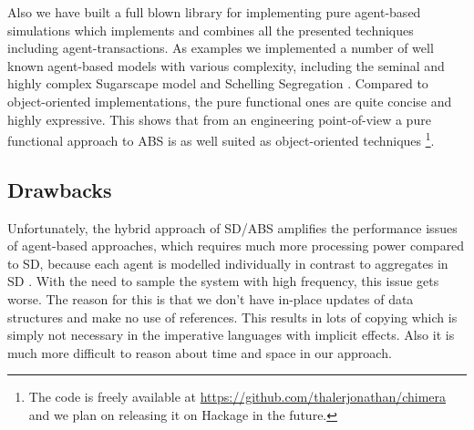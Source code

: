 Also we have built a full blown library for implementing pure agent-based simulations which implements and combines all the presented techniques including agent-transactions. As examples we implemented a number of well known agent-based models with various complexity, including the seminal and highly complex Sugarscape model \cite{epstein_growing_1996} and Schelling Segregation \cite{schelling_dynamic_1971}. Compared to object-oriented implementations, the pure functional ones are quite concise and highly expressive. This shows that from an engineering point-of-view a pure functional approach to ABS is as well suited as object-oriented techniques \footnote{The code is freely available at \url{https://github.com/thalerjonathan/chimera} and we plan on releasing it on Hackage in the future.}.

\subsection*{Drawbacks}
Unfortunately, the hybrid approach of SD/ABS amplifies the performance issues of agent-based approaches, which requires much more processing power compared to SD, because each agent is modelled individually in contrast to aggregates in SD \cite{macal_agent-based_2010}. With the need to sample the system with high frequency, this issue gets worse. The reason for this is that we don't have in-place updates of data structures and make no use of references. This results in lots of copying which is simply not necessary in the imperative languages with implicit effects. Also it is much more difficult to reason about time and space in our approach. %

